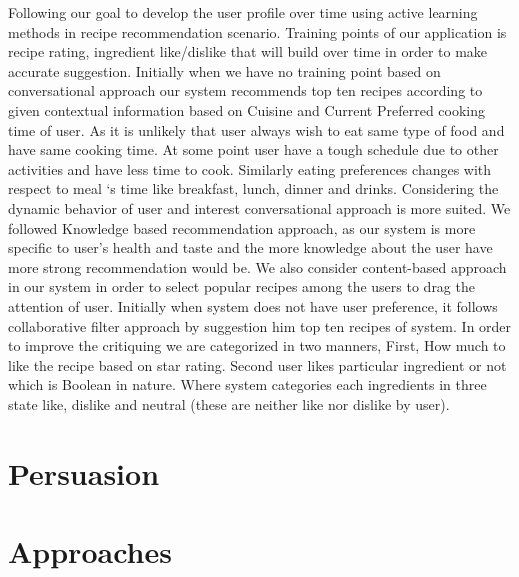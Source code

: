 Following our goal to develop the user profile over time using active learning methods in recipe recommendation scenario. Training points of our application is recipe rating, ingredient like/dislike that will build over time in order to make accurate suggestion. Initially when we have no training point based on conversational approach our system recommends top ten recipes according to given contextual information based on Cuisine and Current Preferred cooking time of user. As it is unlikely that user always wish to eat same type of food and have same cooking time. At some point user have a tough schedule due to other activities and have less time to cook. Similarly eating preferences changes with respect to meal ‘s time like breakfast, lunch, dinner and drinks. Considering the dynamic behavior of user and interest conversational approach is more suited. We followed Knowledge based recommendation approach, as our system is more specific to user’s health and taste and the more knowledge about the user have more strong recommendation would be. We also consider content-based approach in our system in order to select popular recipes among the users to drag the attention of user. Initially when system does not have user preference, it follows collaborative filter approach by suggestion him top ten recipes of system. In order to improve the critiquing we are categorized in two manners, First, How much to like the recipe based on star rating. Second user likes particular ingredient or not which is Boolean in nature. Where system categories each ingredients in three state like, dislike and neutral (these are neither like nor dislike by user).  
	
\section{Persuasion}

\section{Approaches}
